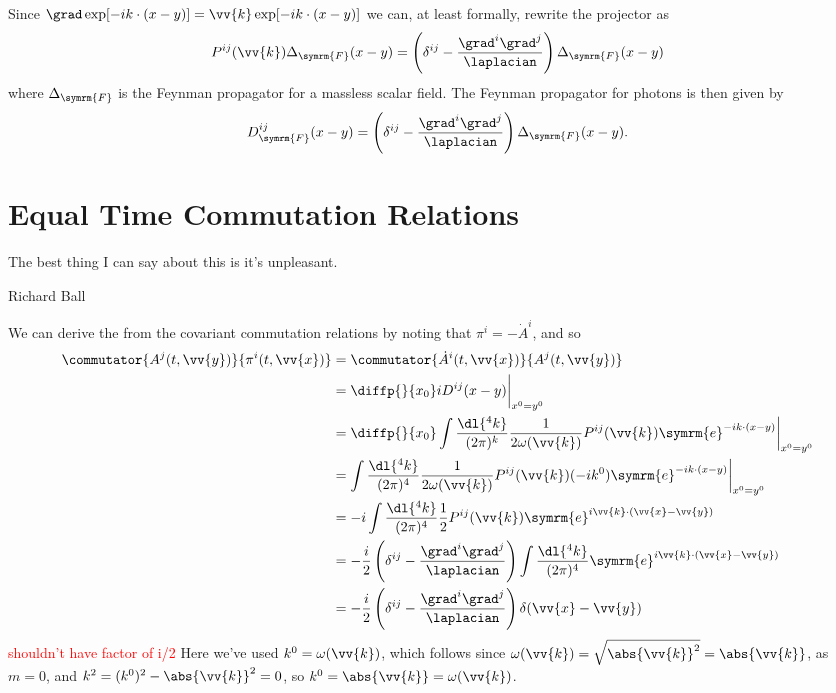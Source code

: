 \documentclass[fleqn]{NotesClass}
\newcommand{\e}{\symrm{e}}
\newcommand{\feynman}{\symrm{F}}
\begin{document}
    Since \(\grad \exp[-ik \cdot (x - y)] = \vv{k} \exp[-ik\cdot (x - y)]\) we can, at least formally, rewrite the projector as
    \begin{equation}
        P^{ij}(\vv{k}) \Delta_{\feynman}(x - y) =  \left( \delta^{ij} - \frac{\grad^i\grad^j}{\laplacian} \right) \Delta_{\feynman}(x - y)
    \end{equation}
    where \(\Delta_{\feynman}\) is the Feynman propagator for a massless scalar field.
    The Feynman propagator for photons is then given by
    \begin{equation}
        D_{\feynman}^{ij} (x - y) = \left( \delta^{ij} - \frac{\grad^i\grad^j}{\laplacian} \right) \Delta_{\feynman}(x - y).
    \end{equation}
    
    \section{Equal Time Commutation Relations}
    \epigraph{The best thing I can say about this is it's unpleasant.}{Richard Ball}
    We can derive the  from the covariant commutation relations by noting that \(\pi^i = -\dot{A}^i\), and so
    \begin{align}
        \commutator{A^j(t, \vv{y})}{\pi^i(t, \vv{x})} &= \commutator{\dot{A}^i(t, \vv{x})}{A^j(t, \vv{y})}\\
        &= \diffp{}{x_0} iD^{ij}(x - y) \bigg|_{x^0 = y^0}\\
        &= \diffp{}{x_0} \int \frac{\dl{^4k}}{(2\pi)^k} \frac{1}{2\omega(\vv{k})} P^{ij}(\vv{k}) \e^{-ik\cdot (x - y)}\bigg|_{x^0 = y^0}\\
        &= \int \frac{\dl{^4k}}{(2\pi)^4} \frac{1}{2\omega(\vv{k})} P^{ij}(\vv{k}) (-ik^0) \e^{-ik\cdot(x - y)}\bigg|_{x^0 = y^0}\\
        &= -i\int \frac{\dl{^4k}}{(2\pi)^4} \frac{1}{2} P^{ij}(\vv{k}) \e^{i\vv{k} \cdot(\vv{x} - \vv{y})} \label{eqn:etcr photons}\\
        &= -\frac{i}{2} \left( \delta^{ij} - \frac{\grad^i\grad^j}{\laplacian} \right) \int \frac{\dl{^4k}}{(2\pi)^4} \e^{i\vv{k} \cdot(\vv{x} - \vv{y})}\\
        &= -\frac{i}{2} \left( \delta^{ij} - \frac{\grad^i\grad^j}{\laplacian} \right) \delta(\vv{x} - \vv{y})
    \end{align}
    \textcolor{red}{shouldn't have factor of i/2}
    Here we've used \(k^0 = \omega(\vv{k})\), which follows since \(\omega(\vv{k}) = \sqrt{\abs{\vv{k}}^2} = \abs{\vv{k}}\), as \(m = 0\), and \(k^2 = (k^0)^2 - \abs{\vv{k}}^2 = 0\), so \(k^0 = \abs{\vv{k}} = \omega(\vv{k})\).
    
\end{document}
